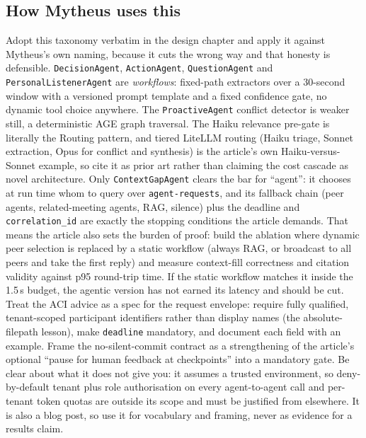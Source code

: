 \subsection{How Mytheus uses this}
\begin{takeaway}
Adopt this taxonomy verbatim in the design chapter and apply it against Mytheus's own naming, because it cuts the wrong way and that honesty is defensible. \texttt{DecisionAgent}, \texttt{ActionAgent}, \texttt{QuestionAgent} and \texttt{PersonalListenerAgent} are \emph{workflows}: fixed-path extractors over a 30-second window with a versioned prompt template and a fixed confidence gate, no dynamic tool choice anywhere. The \texttt{ProactiveAgent} conflict detector is weaker still, a deterministic AGE graph traversal. The Haiku relevance pre-gate is literally the Routing pattern, and tiered LiteLLM routing (Haiku triage, Sonnet extraction, Opus for conflict and synthesis) is the article's own Haiku-versus-Sonnet example, so cite it as prior art rather than claiming the cost cascade as novel architecture. Only \texttt{ContextGapAgent} clears the bar for ``agent'': it chooses at run time whom to query over \texttt{agent-requests}, and its fallback chain (peer agents, related-meeting agents, RAG, silence) plus the deadline and \texttt{correlation\_id} are exactly the stopping conditions the article demands. That means the article also sets the burden of proof: build the ablation where dynamic peer selection is replaced by a static workflow (always RAG, or broadcast to all peers and take the first reply) and measure context-fill correctness and citation validity against p95 round-trip time. If the static workflow matches it inside the 1.5\,s budget, the agentic version has not earned its latency and should be cut. Treat the ACI advice as a spec for the request envelope: require fully qualified, tenant-scoped participant identifiers rather than display names (the absolute-filepath lesson), make \texttt{deadline} mandatory, and document each field with an example. Frame the no-silent-commit contract as a strengthening of the article's optional ``pause for human feedback at checkpoints'' into a mandatory gate. Be clear about what it does not give you: it assumes a trusted environment, so deny-by-default tenant plus role authorisation on every agent-to-agent call and per-tenant token quotas are outside its scope and must be justified from elsewhere. It is also a blog post, so use it for vocabulary and framing, never as evidence for a results claim.
\end{takeaway}

